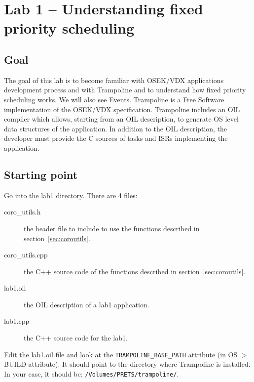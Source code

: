 \documentclass[11pt]{report}
\begin{document}
\chapter{Lab 1 -- Understanding fixed priority scheduling}

\section{Goal}

The goal of this lab is to become familiar with OSEK/VDX applications development process and with Trampoline and to understand how fixed priority scheduling works.
We will also see Events.
Trampoline is a Free Software implementation of the OSEK/VDX specification.
Trampoline includes an OIL compiler which allows, starting from an OIL description, to generate OS level data structures of the application.
In addition to the OIL description, the developer must provide the C sources of tasks and ISRs implementing the application.


\section{Starting point}

Go into the lab1 directory. There are 4 files:

\begin{description}
    \item[coro\_utils.h] the header file to include to use the functions described in section~\ref{sec:coroutils}.
    \item[coro\_utils.cpp] the C++ source code of the functions described in section~\ref{sec:coroutils}.
    \item[lab1.oil] the OIL description of a lab1 application.
    \item[lab1.cpp] the C++ source code for the lab1.
\end{description}

Edit the lab1.oil file and look at the \texttt{TRAMPOLINE\_BASE\_PATH} attribute (in OS $>$ BUILD attribute).
It should point to the directory where Trampoline is installed.
In your case, it should be: \texttt{/Volumes/PRETS/trampoline/}.


\end{document}
